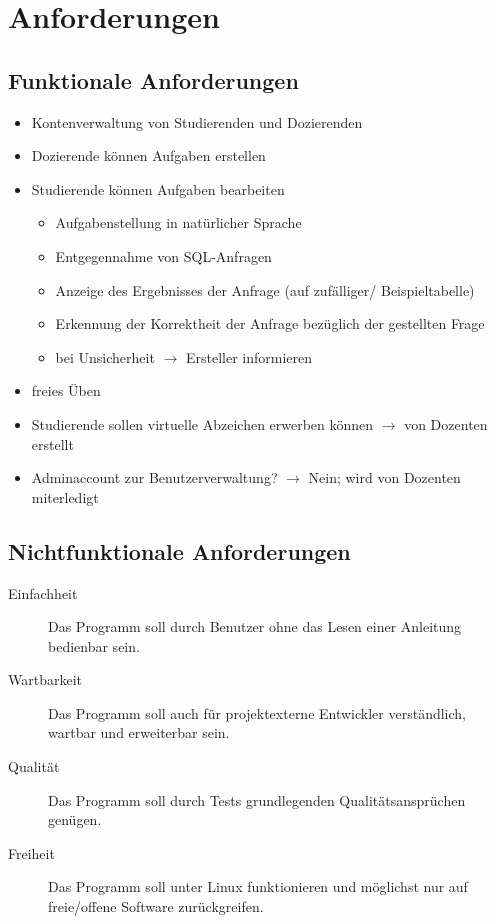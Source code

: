 \section{Anforderungen}\label{sec:requirements}

\subsection{Funktionale Anforderungen}

\begin{itemize}
  \item Kontenverwaltung von Studierenden und Dozierenden
  \item Dozierende können Aufgaben erstellen
  \item Studierende können Aufgaben bearbeiten
  \begin{itemize}
    \item Aufgabenstellung in natürlicher Sprache
    \item Entgegennahme von SQL-Anfragen
    \item Anzeige des Ergebnisses der Anfrage (auf zufälliger/ Beispieltabelle)
    \item Erkennung der Korrektheit der Anfrage bezüglich der gestellten Frage
    \item bei Unsicherheit $\rightarrow$ Ersteller informieren
  \end{itemize}
  \item freies Üben
  \item Studierende sollen virtuelle Abzeichen erwerben können $\rightarrow$ von Dozenten erstellt
  \item Adminaccount zur Benutzerverwaltung? $\rightarrow$ Nein; wird von Dozenten miterledigt
\end{itemize}

\subsection{Nichtfunktionale Anforderungen}
\begin{description}
  \item [Einfachheit] Das Programm soll durch Benutzer ohne das Lesen einer Anleitung bedienbar sein.
  \item [Wartbarkeit] Das Programm soll auch für projektexterne Entwickler verständlich, wartbar und erweiterbar sein.
  \item [Qualität] Das Programm soll durch Tests grundlegenden Qualitätsansprüchen genügen.
  \item [Freiheit] Das Programm soll unter Linux funktionieren und möglichst nur auf freie/offene Software zurückgreifen.
\end{description}

